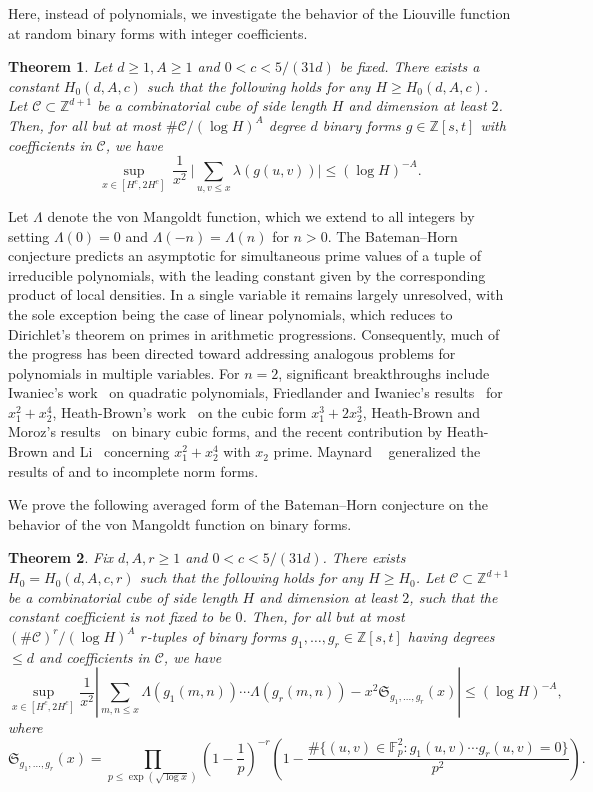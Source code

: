 \documentclass[reqno, 11pt]{amsart}
\renewcommand{\leq}{\leqslant}
\renewcommand{\geq}{\geqslant}
\newtheorem{theorem}{Theorem}[section]
\theoremstyle{definition}
\theoremstyle{definition}
\renewcommand{\geq}{\geqslant}
\renewcommand{\leq}{\leqslant}
\newcommand{\CCC}{\mathcal{C}}
\newcommand{\ZZ}{\mathbb{Z}}
\numberwithin{equation}{section}
\begin{document}
Here, instead of polynomials, we investigate the behavior of the Liouville function at random binary forms with integer coefficients.


\begin{theorem}\label{thm-Chowla}
	Let $d \geq 1, A \geq 1$ and $0 < c < 5/(31d)$ be fixed. There exists a constant $H_0(d,A,c)$ such that the following holds for any $H \geq H_0(d,A,c)$. Let $\mathcal{C} \subset \ZZ^{d+1}$ be a combinatorial cube of side length $H$ and dimension at least $2$. Then, for all but at most $\#\CCC / (\log H)^A$ degree $d$ binary forms $g \in \ZZ[s,t]$ with coefficients in $\CCC$, we have
	$$\sup_{x \in [H^c, 2H^c]} \, \frac{1}{x^2} \ \Bigg| \sum_{u, v \leq x} \lambda(g(u,v)) \Bigg| \leq (\log H)^{-A}.$$
\end{theorem}



Let $\Lambda$ denote the von Mangoldt function, which we extend to all integers by setting $\Lambda(0) = 0$ and $\Lambda(-n) = \Lambda(n)$ for $n > 0$.
The Bateman--Horn conjecture predicts an asymptotic for simultaneous prime values of a tuple of irreducible polynomials, with the leading constant given by the corresponding product of local densities. In a single variable it remains largely unresolved, with the sole exception being the case of linear polynomials, which reduces to Dirichlet's theorem on primes in arithmetic progressions. Consequently, much of the progress has been directed toward addressing analogous problems for polynomials in multiple variables. For $n = 2$, significant breakthroughs include Iwaniec's work~\cite{Iwa-1} on quadratic polynomials, Friedlander and Iwaniec's results~\cite{Fri-Iwa-1} for $x_1^2 + x_2^4$, Heath-Brown's work~\cite{HB2} on the cubic form $x_1^3 + 2x_2^3$, Heath-Brown and Moroz's results~\cite{HB-Mo-1} on binary cubic forms, and the recent contribution by Heath-Brown and Li~\cite{HB-Li-1} concerning $x_1^2 + x_2^4$ with $x_2$ prime. Maynard ~\cite{May} generalized the results of \cite{Fri-Iwa-1} and \cite{HB2} to incomplete norm forms.


We prove the following averaged form of the Bateman--Horn conjecture on the behavior of the von Mangoldt function on binary forms.

\begin{theorem}\label{thm-BH}
	Fix $d, A, r \geq 1$ and $0 < c < 5/(31d)$. There exists $H_0=H_0(d, A, c, r)$ such that the following holds for any $H \geq H_0$. Let $\mathcal{C} \subset \mathbb{Z}^{d+1}$ be a combinatorial cube of side length $H$ and dimension at least $2$, such that the constant coefficient is not fixed to be $0$. Then, for all but at most $(\#\mathcal{C})^r / (\log H)^A$ $r$-tuples of binary forms $g_1, \dots, g_r \in \mathbb{Z}[s, t]$ having degrees $\leq d$ and coefficients in $\mathcal{C}$, we have
\[
\sup_{x \in [H^c, 2H^c]} \frac{1}{x^2} \left| \sum_{m, n \leq x} \Lambda(g_1(m, n)) \cdots \Lambda(g_r(m, n)) - x^2\mathfrak{S}_{g_1, \dots, g_r}(x) \right| \leq (\log H)^{-A},
\]
where
\[
\mathfrak{S}_{g_1, \dots, g_r}(x) = \prod_{p \leq \exp(\sqrt{\log x})} \left( 1 - \frac{1}{p} \right)^{-r} \left( 1 - \frac{\#\{(u, v) \in \mathbb{F}_p^2 : g_1(u, v) \cdots g_r(u, v) = 0 \}}{p^2} \right).
\]
\end{theorem}
\end{document}
